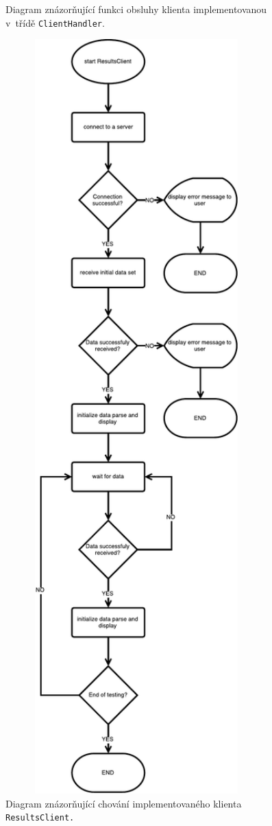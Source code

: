 \begin{figure}
\begin{minipage}{0.45\textwidth}
	  \caption{Diagram znázorňující funkci obsluhy klienta implementovanou v~třídě \texttt{ClientHandler}.}
	  \label{fig:clientHandler_flowchart}
	  \end{minipage}\hfill
	  \begin{minipage}{0.45\textwidth}
	    \centering
	    \includegraphics[width=0.9\textwidth, height=0.95\textheight, keepaspectratio, center]{obrazky-figures/trview_resultsclient_flowchart.pdf}
	  \caption{Diagram znázorňující chování implementovaného klienta \texttt{ResultsClient.}}
	  \label{fig:resultsclient_flowchart}
	  \end{minipage}
	\end{figure}
	
